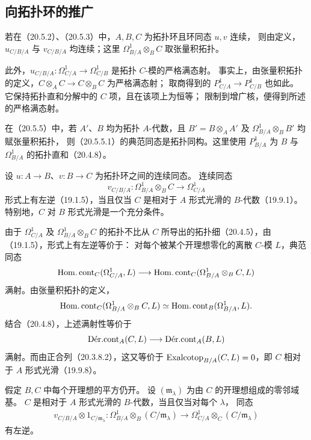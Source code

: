 \subsection{向拓扑环的推广}

若在（20.5.2）、（20.5.3）中，$A,B,C$ 为拓扑环且环同态 $u,v$ 连续，
则由定义，$u_{C/B/A}$ 与 $v_{C/B/A}$ 均连续；这里
$\Omega^1_{B/A}\otimes_B C$ 取张量积拓扑。

此外，$u_{C/B/A}:\Omega^1_{C/A}\to\Omega^1_{C/B}$ 是拓扑 $C$-模的严格满态射。
事实上，由张量积拓扑的定义，$C\otimes_A C\to C\otimes_B C$ 为严格满态射；
取商得到的 $P^1_{C/A}\to P^1_{C/B}$ 也如此。
它保持拓扑直和分解中的 $C$ 项，且在该项上为恒等；
限制到增广核，便得到所述的严格满态射。

在（20.5.5）中，若 $A'$、$B$ 均为拓扑 $A$-代数，且
$B'=B\otimes_A A'$ 及 $\Omega^1_{B/A}\otimes_B B'$ 均赋张量积拓扑，
则（20.5.5.1）的典范同态是拓扑同构。这里使用
$P^1_{B/A}$ 为 $B$ 与 $\Omega^1_{B/A}$ 的拓扑直和（20.4.8）。

设 $u:A\to B$、$v:B\to C$ 为拓扑环之间的连续同态。
连续同态
\[
 v_{C/B/A}:\Omega^1_{B/A}\otimes_B C\longrightarrow\Omega^1_{C/A}
\]
形式上有左逆（19.1.5），当且仅当 $C$ 是相对于 $A$ 形式光滑的
$B$-代数（19.9.1）。特别地，$C$ 对 $B$ 形式光滑是一个充分条件。

由于 $\Omega^1_{C/A}$ 及 $\Omega^1_{B/A}\otimes_B C$ 的拓扑不比从 $C$
所导出的拓扑细（20.4.5），由（19.1.5），形式上有左逆等价于：
对每个被某个开理想零化的离散 $C$-模 $L$，典范同态
\[
 \HomCont_C(\Omega^1_{C/A},L)
 \longrightarrow\HomCont_C(\Omega^1_{B/A}\otimes_B C,L)
\]
满射。由张量积拓扑的定义，
\[
 \HomCont_C(\Omega^1_{B/A}\otimes_B C,L)
 \simeq\HomCont_B(\Omega^1_{B/A},L).
\]
结合（20.4.8），上述满射性等价于
\[
 \DerCont_A(C,L)\longrightarrow\DerCont_A(B,L)
\]
满射。而由正合列（20.3.8.2），这又等价于
$\Exalcotop_{B/A}(C,L)=0$，即 $C$ 相对于 $A$ 形式光滑（19.9.8）。

假定 $B,C$ 中每个开理想的平方仍开。
设 $(\mathfrak m_\lambda)$ 为由 $C$ 的开理想组成的零邻域基。
$C$ 是相对于 $A$ 形式光滑的 $B$-代数，当且仅当对每个 $\lambda$，
同态
\begin{equation}
 \begin{aligned}
 v_{C/B/A}\otimes1_{C/\mathfrak m_\lambda}:
 \Omega^1_{B/A}\otimes_B(C/\mathfrak m_\lambda)
 \longrightarrow
 \Omega^1_{C/A}\otimes_C(C/\mathfrak m_\lambda)
 \end{aligned}
 \tag{20.7.3.1}
\end{equation}
有左逆。

